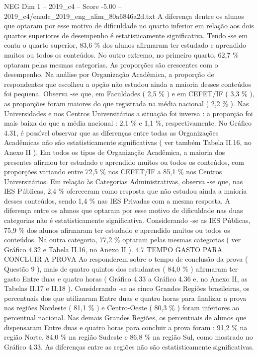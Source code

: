 \begin{textsample}{NEG Dim 1 – 2019\_c4 – Score -5.00 – 2019\_c4/enade\_2019\_eng\_alim\_80a6846a2d.txt}
A diferença dentre os alunos que optaram por esse motivo de dificuldade no quarto inferior em relação aos dois quartos superiores de desempenho é estatisticamente significativa.
Tendo -se em conta o quarto superior, 83,6 \% dos alunos afirmaram ter estudado e aprendido muitos ou todos os conteúdos.
No outro extremo, no primeiro quarto, 62,7 \% optaram pelas mesmas categorias.
As proporções são crescentes com o desempenho.
Na análise por Organização Acadêmica, a proporção de respondentes que escolheu a opção não estudou ainda a maioria desses conteúdos foi pequena.
Observa -se que, em Faculdades ( 2,5 \% ) e em CEFET/IF ( 3,3 \% ), as proporções foram maiores do que registrada na média nacional ( 2,2 \% ).
Nas Universidades e nos Centros Universitários a situação foi inversa : a proporção foi mais baixa do que a média nacional : 2,1 \% e 1,1 \%, respectivamente.
No Gráfico 4.31, é possível observar que as diferenças entre todas as Organizações Acadêmicas não são estatisticamente significativas ( ver também Tabela II.16, no Anexo II ).
Em todos os tipos de Organização Acadêmica, a maioria dos presentes afirmou ter estudado e aprendido muitos ou todos os conteúdos, com proporções variando entre 72,5 \% nos CEFET/IF a 85,1 \% nos Centros Universitários.
Em relação às Categorias Administrativas, observa -se que, nas IES Públicas, 2,4 \% ofereceram como resposta que não estudou ainda a maioria desses conteúdos, sendo 1,4 \% nas IES Privadas com a mesma resposta.
A diferença entre os alunos que optaram por esse motivo de dificuldade nas duas categorias não é estatisticamente significativa.
Considerando -se as IES Públicas, 75,9 \% dos alunos afirmaram ter estudado e aprendido muitos ou todos os conteúdos.
Na outra categoria, 77,2 \% optaram pelas mesmas categorias ( ver Gráfico 4.32 e Tabela II.16, no Anexo II ). 4.7 TEMPO GASTO PARA CONCLUIR A PROVA Ao responderem sobre o tempo de conclusão da prova ( Questão 9 ), mais de quatro quintos dos estudantes ( 84,0 \% ) afirmaram ter gasto Entre duas e quatro horas ( Gráfico 4.33 a Gráfico 4.36 e, no Anexo II, as Tabelas II.17 e II.18 ).
Considerando -se as cinco Grandes Regiões brasileiras, os percentuais dos que utilizaram Entre duas e quatro horas para finalizar a prova nas regiões Nordeste ( 81,1 \% ) e Centro-Oeste ( 80,3 \% ) foram inferiores ao percentual nacional.
Nas demais Grandes Regiões, os percentuais de alunos que dispensaram Entre duas e quatro horas para concluir a prova foram : 91,2 \% na região Norte, 84,0 \% na região Sudeste e 86,8 \% na região Sul, como mostrado no Gráfico 4.33.
As diferenças entre as regiões não são estatisticamente significativas.

\end{textsample}
